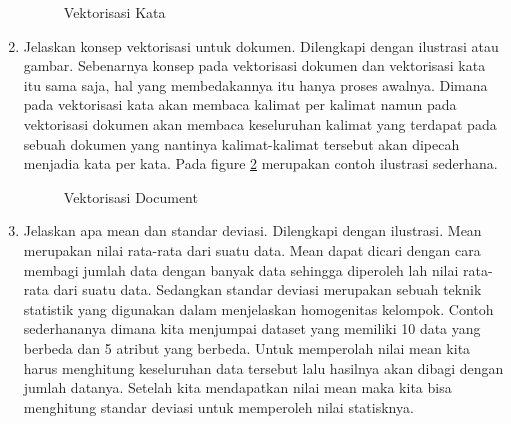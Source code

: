 \begin{enumerate}
	\begin{figure}[!htbp]
		\caption{Vektorisasi Kata}
		\label{YNC5-2}
	\end{figure}

\item Jelaskan konsep vektorisasi untuk dokumen. Dilengkapi dengan ilustrasi atau gambar.
	\subitem Sebenarnya konsep pada vektorisasi dokumen dan vektorisasi kata itu sama saja, hal yang membedakannya itu hanya proses awalnya. Dimana pada vektorisasi kata akan membaca kalimat per kalimat namun pada vektorisasi dokumen akan membaca keseluruhan kalimat yang terdapat pada sebuah dokumen yang nantinya kalimat-kalimat tersebut akan dipecah menjadia kata per kata. Pada figure \ref{YNC5-3} merupakan contoh ilustrasi sederhana.

	\begin{figure}[!htbp]
		\caption{Vektorisasi Document}
		\label{YNC5-3}
	\end{figure}

\item Jelaskan apa mean dan standar deviasi. Dilengkapi dengan ilustrasi.
	\subitem Mean merupakan nilai rata-rata dari suatu data. Mean dapat dicari dengan cara membagi jumlah data dengan banyak data sehingga diperoleh lah nilai rata-rata dari suatu data. Sedangkan standar deviasi merupakan sebuah teknik statistik yang digunakan dalam menjelaskan homogenitas kelompok. Contoh sederhananya dimana kita menjumpai dataset yang memiliki 10 data yang berbeda dan 5 atribut yang berbeda. Untuk memperolah nilai mean kita harus menghitung keseluruhan data tersebut lalu hasilnya akan dibagi dengan jumlah datanya. Setelah kita mendapatkan nilai mean maka kita bisa menghitung standar deviasi untuk memperoleh nilai statisknya.


\end{enumerate}
